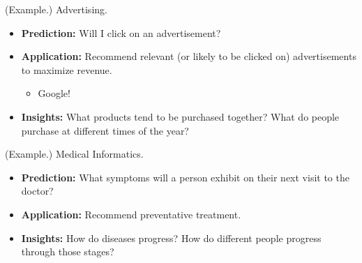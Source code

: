 \documentclass[letterpaper]{article}
\begin{document}
\begin{mdframed}[]
    (Example.) Advertising. 
    \begin{itemize}
        \item \textbf{Prediction:} Will I click on an advertisement? 
        \item \textbf{Application:} Recommend relevant (or likely to be clicked on) advertisements to maximize revenue.
        \begin{itemize}
            \item Google! 
        \end{itemize}
        \item \textbf{Insights:} What products tend to be purchased together? What do people purchase at different times of the year?  
    \end{itemize}
\end{mdframed}

\begin{mdframed}[]
    (Example.) Medical Informatics.
    \begin{itemize}
        \item \textbf{Prediction:} What symptoms will a person exhibit on their next visit to the doctor? 
        \item \textbf{Application:} Recommend preventative treatment. 
        \item \textbf{Insights:} How do diseases progress? How do different people progress through those stages? 
    \end{itemize}
\end{mdframed}
\end{document}
